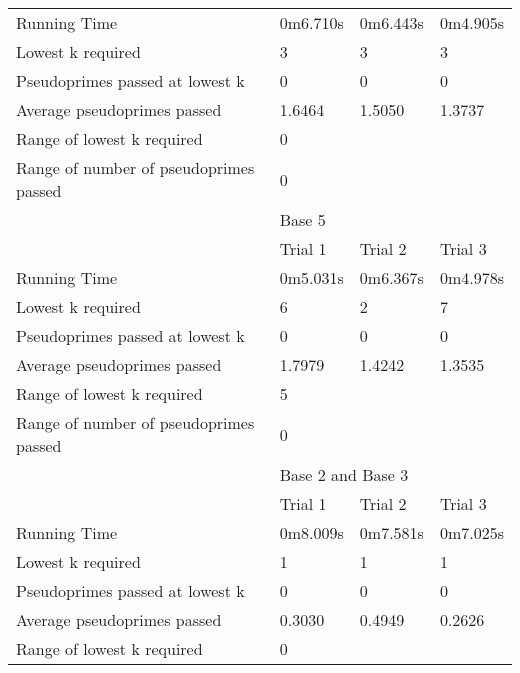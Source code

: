 \documentclass{article}
\begin{document}
\begin{appendices}
\begin{longtable}{llll}
Running Time                           & 0m6.710s & 0m6.443s & 0m4.905s         \\
Lowest k required                      & 3        & 3        & 3                \\
Pseudoprimes passed at lowest k        & 0        & 0        & 0                \\
Average pseudoprimes passed            & 1.6464   & 1.5050   & 1.3737           \\
\cmidrule(lr){2-4}
Range of lowest k required             & \multicolumn{3}{l}{0}                  \\
Range of number of pseudoprimes passed & \multicolumn{3}{l}{0}                  \\
\midrule
                                       & \multicolumn{3}{l}{Base 5}             \\
\midrule
                                       & Trial 1  & Trial 2  & Trial 3          \\
Running Time                           & 0m5.031s & 0m6.367s & 0m4.978s         \\
Lowest k required                      & 6        & 2        & 7                \\
Pseudoprimes passed at lowest k        & 0        & 0        & 0                \\
Average pseudoprimes passed            & 1.7979   & 1.4242   & 1.3535           \\
\cmidrule(lr){2-4}
Range of lowest k required             & \multicolumn{3}{l}{5}                  \\
Range of number of pseudoprimes passed & \multicolumn{3}{l}{0}                  \\
\midrule
                                       & \multicolumn{3}{l}{Base 2 and Base 3}  \\
\midrule
                                       & Trial 1  & Trial 2  & Trial 3          \\
Running Time                           & 0m8.009s & 0m7.581s & 0m7.025s         \\
Lowest k required                      & 1        & 1        & 1                \\
Pseudoprimes passed at lowest k        & 0        & 0        & 0                \\
Average pseudoprimes passed            & 0.3030   & 0.4949   & 0.2626           \\
\cmidrule(lr){2-4}
Range of lowest k required             & \multicolumn{3}{l}{0}                  \\

\end{longtable}
\end{appendices}
\end{document}
